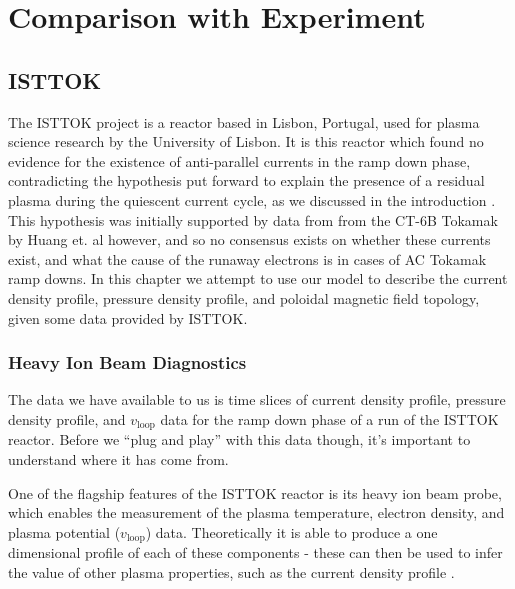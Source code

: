 
\chapter{Comparison with Experiment}
\label{chapter5}

\section{ISTTOK}

The ISTTOK project is a reactor based in Lisbon, Portugal, used for plasma science research by the 
University of Lisbon. It is this reactor which found 
no evidence for the existence of anti-parallel currents in the ramp down phase, contradicting 
the hypothesis put forward to explain the presence of a residual plasma during the quiescent 
current cycle, as we discussed in the introduction \cite{malaquias-matthew}. 
This hypothesis was initially supported by data from from the CT-6B Tokamak by Huang et. al \cite{huang-ct-tokamak} however, 
and so no consensus exists on whether these currents exist, and what the cause of the runaway electrons is in cases of 
AC Tokamak ramp downs. In this chapter we attempt to use our model to describe the current density profile, pressure density profile, 
and poloidal magnetic field topology, given some data provided by ISTTOK.


\subsection{Heavy Ion Beam Diagnostics}

The data we have available to us is time slices of current density profile, pressure density profile, 
and $v_{\text{loop}}$ data for the ramp down phase of a run of the ISTTOK reactor. Before 
we ``plug and play'' with this data though, it's important to understand where it has come from. 

One of the flagship features of the ISTTOK reactor is its heavy ion beam probe, which enables 
the measurement of the plasma temperature, electron density, and plasma potential ($v_{\text{loop}}$) 
data. Theoretically it is able to produce a one dimensional profile of each of these components - these 
can then be used to infer the value of other plasma properties, such as the current density profile \cite{ion-beam-diagnostics}.

